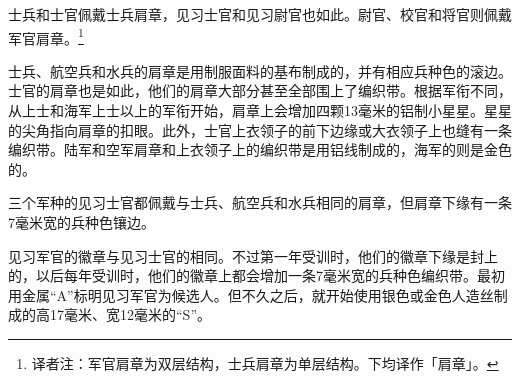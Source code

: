 士兵和士官佩戴士兵肩章，见习士官和见习尉官也如此。尉官、校官和将官则佩戴军官肩章。\footnote{译者注：军官肩章为双层结构，士兵肩章为单层结构。\cite{clarionv}下均译作「肩章」。}

士兵、航空兵和水兵的肩章是用制服面料的基布制成的，并有相应兵种色的滚边。士官的肩章也是如此，他们的肩章大部分甚至全部围上了编织带。根据军衔不同，从上士和海军上士以上的军衔开始，肩章上会增加四颗13毫米的铝制小星星。星星的尖角指向肩章的扣眼。此外，士官上衣领子的前下边缘或大衣领子上也缝有一条编织带。陆军和空军肩章和上衣领子上的编织带是用铝线制成的，海军的则是金色的。

三个军种的见习士官都佩戴与士兵、航空兵和水兵相同的肩章，但肩章下缘有一条7毫米宽的兵种色镶边。

见习军官的徽章与见习士官的相同。不过第一年受训时，他们的徽章下缘是封上的，以后每年受训时，他们的徽章上都会增加一条7毫米宽的兵种色编织带。最初用金属“A”标明见习军官为候选人。但不久之后，就开始使用银色或金色人造丝制成的高17毫米、宽12毫米的“S”。

